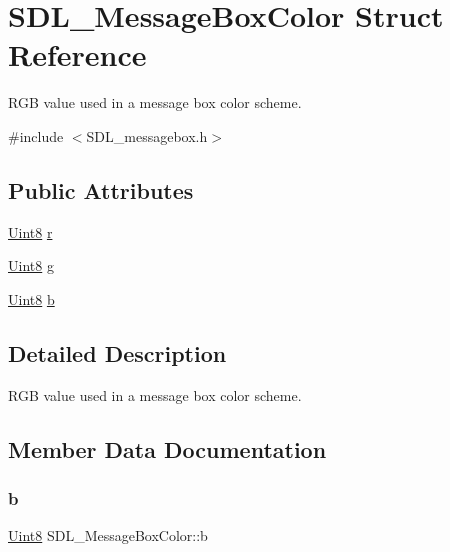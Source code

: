 \hypertarget{struct_s_d_l___message_box_color}{}\section{S\+D\+L\+\_\+\+Message\+Box\+Color Struct Reference}
\label{struct_s_d_l___message_box_color}


R\+GB value used in a message box color scheme.  




{\ttfamily \#include $<$S\+D\+L\+\_\+messagebox.\+h$>$}

\subsection*{Public Attributes}
\begin{DoxyCompactItemize}
\item 
\hyperlink{_s_d_l__stdinc_8h_a2944638813a090aa23e62f4da842c3e2}{Uint8} \hyperlink{struct_s_d_l___message_box_color_a43ab2172c10058380fcf67ecc3f53184}{r}
\item 
\hyperlink{_s_d_l__stdinc_8h_a2944638813a090aa23e62f4da842c3e2}{Uint8} \hyperlink{struct_s_d_l___message_box_color_a5820adab0b32aa3eade101ea36ed6b4a}{g}
\item 
\hyperlink{_s_d_l__stdinc_8h_a2944638813a090aa23e62f4da842c3e2}{Uint8} \hyperlink{struct_s_d_l___message_box_color_ad1215a42167cb5b190ff8f19dbd42066}{b}
\end{DoxyCompactItemize}


\subsection{Detailed Description}
R\+GB value used in a message box color scheme. 

\subsection{Member Data Documentation}
\mbox{\label{struct_s_d_l___message_box_color_ad1215a42167cb5b190ff8f19dbd42066}} 
\subsubsection{\texorpdfstring{b}{b}}
{\footnotesize\ttfamily \hyperlink{_s_d_l__stdinc_8h_a2944638813a090aa23e62f4da842c3e2}{Uint8} S\+D\+L\+\_\+\+Message\+Box\+Color\+::b}

